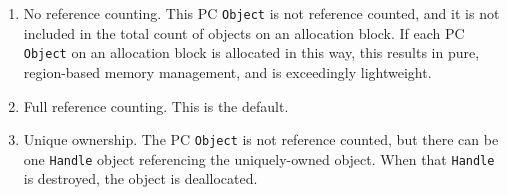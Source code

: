 \begin{enumerate}

\item No reference counting.  This PC \texttt{Object} is not reference counted, and it is not included in the total count of objects on an allocation
block.  If each PC \texttt{Object} on an allocation block
is allocated in this way, this results in pure, region-based memory management, and is exceedingly lightweight.
\item Full reference counting.  This is the default.
\item Unique ownership.  The PC \texttt{Object} is not reference counted, but there can be one \texttt{Handle} object referencing the uniquely-owned
object.  When that \texttt{Handle} is destroyed, the object is deallocated.

\end{enumerate}


